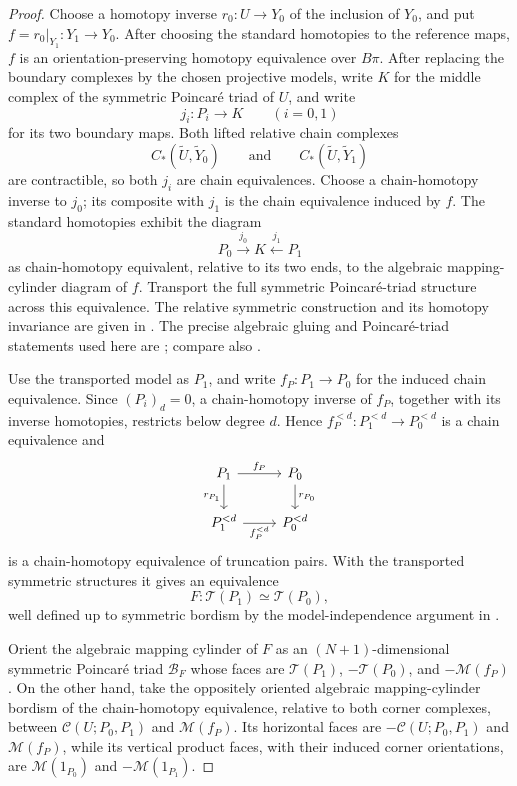 \documentclass[10pt,reqno]{amsart}
\numberwithin{equation}{section}
\theoremstyle{definition}
\theoremstyle{remark}
\begin{document}
\begin{proof}
Choose a homotopy inverse \(r_0:U\to Y_0\) of the inclusion of
\(Y_0\), and put \(f=r_0|_{Y_1}:Y_1\to Y_0\).  After choosing the
standard homotopies to the reference maps, \(f\) is an
orientation-preserving homotopy equivalence over \(B\pi\).
After replacing the boundary complexes by the chosen projective
models, write \(K\) for the middle complex of the symmetric
Poincar\'e triad of \(U\), and write
\[
j_i:P_i\longrightarrow K
\qquad(i=0,1)
\]
for its two boundary maps.  Both lifted relative chain complexes
\[
C_*(\widetilde U,\widetilde Y_0)
\qquad\text{and}\qquad
C_*(\widetilde U,\widetilde Y_1)
\]
are contractible, so both \(j_i\) are chain equivalences.  Choose a
chain-homotopy inverse to \(j_0\); its composite with \(j_1\) is the
chain equivalence induced by \(f\).  The standard homotopies exhibit
the diagram
\[
P_0\xrightarrow{j_0}K\xleftarrow{j_1}P_1
\]
as chain-homotopy equivalent, relative to its two ends, to the
algebraic mapping-cylinder diagram of \(f\).  Transport the full
symmetric Poincar\'e-triad structure across this equivalence.  The
relative symmetric construction and its homotopy invariance are given
in \cite[Propositions~6.2--6.3]{RanickiSurgeryII}.  The precise algebraic
gluing and Poincar\'e-triad statements used here are
\cite[\S1.7 and \S2.1, especially Proposition~2.1.1]{RanickiExact}; compare also
\cite[Definitions~1.6--1.7 and Proposition~1.13]{RanickiALT}.

Use the transported model as \(P_1\), and write
\(f_P:P_1\to P_0\) for the induced chain equivalence.  Since
\((P_i)_d=0\), a chain-homotopy inverse of \(f_P\), together with its
inverse homotopies, restricts below degree \(d\).  Hence
\(f_P^{<d}:P_1^{<d}\to P_0^{<d}\) is a chain equivalence and
\[
\begin{tikzcd}
P_1 \arrow[r,"f_P"] \arrow[d,"r_{P_1}"']
& P_0 \arrow[d,"r_{P_0}"]\\
P_1^{<d} \arrow[r,"f_P^{<d}"']
& P_0^{<d}
\end{tikzcd}
\]
is a chain-homotopy equivalence of truncation pairs.  With the
transported symmetric structures it gives an equivalence
\[
F:\mathcal T(P_1)\simeq\mathcal T(P_0),
\]
well defined up to symmetric bordism by the model-independence
argument in \cite[Proposition~2.26]{DFW}.

Orient the algebraic mapping cylinder of \(F\) as an
\((N+1)\)-dimensional symmetric Poincar\'e triad \(\mathcal B_F\)
whose faces are \(\mathcal T(P_1)\), \(-\mathcal T(P_0)\), and
\(-\mathcal M(f_P)\).  On the other hand, take the oppositely
oriented algebraic mapping-cylinder bordism of the chain-homotopy
equivalence, relative to both corner complexes, between
\(\mathcal C(U;P_0,P_1)\) and \(\mathcal M(f_P)\).  Its horizontal
faces are \(-\mathcal C(U;P_0,P_1)\) and
\(\mathcal M(f_P)\), while its vertical product faces, with their
induced corner orientations, are \(\mathcal M(1_{P_0})\) and
\(-\mathcal M(1_{P_1})\).


\end{proof}
\end{document}
